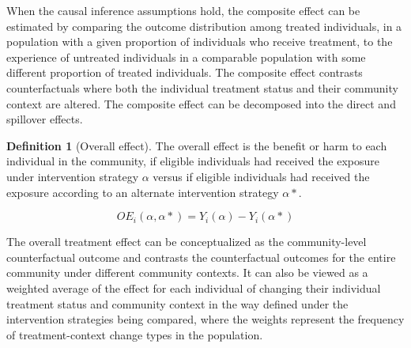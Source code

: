 \documentclass{article}
\theoremstyle{definition}
\newtheorem{definition}{Definition}[section]
\begin{document}
When the causal inference assumptions hold, the composite effect can be estimated by comparing the outcome distribution among treated individuals, in a population with a given proportion of individuals who receive treatment, to the experience of untreated individuals in a comparable population with some different proportion of treated individuals. The composite effect contrasts counterfactuals where both the individual treatment status and their community context are altered. The composite effect can be decomposed into the direct and spillover effects.

\begin{definition}[Overall effect] The overall effect is the benefit or harm to each individual in the community, if  eligible individuals had received the exposure under intervention strategy $\alpha$ versus if eligible individuals had received the exposure according to an alternate intervention strategy $\alpha*$.
\end{definition}

\begin{equation}\label{eq:4}
   OE_{i}\left(\alpha,\alpha*\right) = Y_{i}\left(\alpha\right) - Y_{i}\left(\alpha*\right)	
\end{equation}

The overall treatment effect can be conceptualized as the community-level counterfactual outcome and contrasts the counterfactual outcomes for the entire community under different community contexts. It can also be viewed as a weighted average of the effect for each individual of changing their individual treatment status and community context in the way defined under the intervention strategies being compared, where the weights represent the frequency of treatment-context change types in the population.
\end{document}
